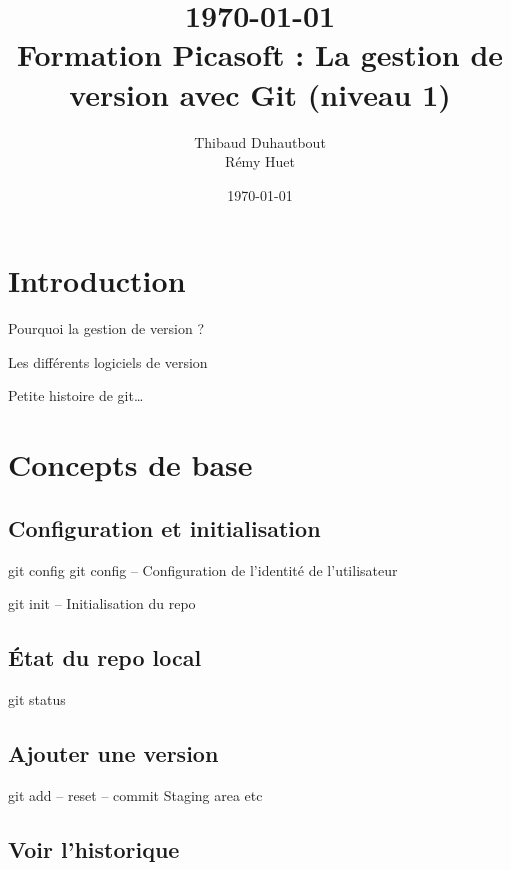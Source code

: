 \documentclass[usepdftitle=false]{beamer}
\title[Formation Git\_v1]{\today \\ Formation Picasoft : La gestion de version avec Git (niveau 1)}
\author[T. Duhautbout - R. Huet]{Thibaud {\sc Duhautbout} \\ Rémy {\sc Huet}}
\institute[Picasoft]{Association Picasoft}
\date\today
\begin{document}
\begin{frame}
	\titlepage 
\end{frame}

\section{Introduction}

\begin{frame}{Pourquoi la gestion de version ?}
\end{frame}

\begin{frame}{Les différents logiciels de version}
\end{frame}

\begin{frame}{Petite histoire de git\ldots}
\end{frame}

\section{Concepts de base}

\subsection{Configuration et initialisation}

\begin{frame}{git config}
	git config -- Configuration de l'identité de l'utilisateur

	git init -- Initialisation du repo
\end{frame}

\subsection{\'Etat du repo local}

\begin{frame}{git status}
\end{frame}

\subsection{Ajouter une version}

\begin{frame}{git add -- reset -- commit}
	Staging area etc
\end{frame}

\subsection{Voir l'historique}
\end{document}
